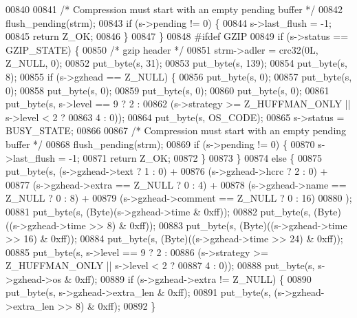 \begin{DoxyCode}
{00840 
00841         \textcolor{comment}{/* Compression must start with an empty pending buffer */}
00842         flush\_pending(strm);
00843         \textcolor{keywordflow}{if} (s->pending != 0) \{
00844             s->last\_flush = -1;
00845             \textcolor{keywordflow}{return} Z\_OK;
00846         \}
00847     \}
00848 \textcolor{preprocessor}{#ifdef GZIP}
00849     \textcolor{keywordflow}{if} (s->status == GZIP\_STATE) \{
00850         \textcolor{comment}{/* gzip header */}
00851         strm->adler = crc32(0L, Z\_NULL, 0);
00852         put\_byte(s, 31);
00853         put\_byte(s, 139);
00854         put\_byte(s, 8);
00855         \textcolor{keywordflow}{if} (s->gzhead == Z\_NULL) \{
00856             put\_byte(s, 0);
00857             put\_byte(s, 0);
00858             put\_byte(s, 0);
00859             put\_byte(s, 0);
00860             put\_byte(s, 0);
00861             put\_byte(s, s->level == 9 ? 2 :
00862                      (s->strategy >= Z\_HUFFMAN\_ONLY || s->level < 2 ?
00863                       4 : 0));
00864             put\_byte(s, OS\_CODE);
00865             s->status = BUSY\_STATE;
00866 
00867             \textcolor{comment}{/* Compression must start with an empty pending buffer */}
00868             flush\_pending(strm);
00869             \textcolor{keywordflow}{if} (s->pending != 0) \{
00870                 s->last\_flush = -1;
00871                 \textcolor{keywordflow}{return} Z\_OK;
00872             \}
00873         \}
00874         \textcolor{keywordflow}{else} \{
00875             put\_byte(s, (s->gzhead->text ? 1 : 0) +
00876                      (s->gzhead->hcrc ? 2 : 0) +
00877                      (s->gzhead->extra == Z\_NULL ? 0 : 4) +
00878                      (s->gzhead->name == Z\_NULL ? 0 : 8) +
00879                      (s->gzhead->comment == Z\_NULL ? 0 : 16)
00880                      );
00881             put\_byte(s, (Byte)(s->gzhead->time & 0xff));
00882             put\_byte(s, (Byte)((s->gzhead->time >> 8) & 0xff));
00883             put\_byte(s, (Byte)((s->gzhead->time >> 16) & 0xff));
00884             put\_byte(s, (Byte)((s->gzhead->time >> 24) & 0xff));
00885             put\_byte(s, s->level == 9 ? 2 :
00886                      (s->strategy >= Z\_HUFFMAN\_ONLY || s->level < 2 ?
00887                       4 : 0));
00888             put\_byte(s, s->gzhead->os & 0xff);
00889             \textcolor{keywordflow}{if} (s->gzhead->extra != Z\_NULL) \{
00890                 put\_byte(s, s->gzhead->extra\_len & 0xff);
00891                 put\_byte(s, (s->gzhead->extra\_len >> 8) & 0xff);
00892             \}
}
\end{DoxyCode}
